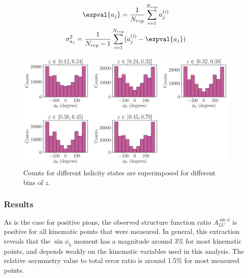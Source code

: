 \begin{gather}
  \expval{a_j} = \frac{1}{N_{rep}} \sum_{i=1}^{N_{rep}} a_{j}^{(i)} \\
  \sigma_{a_j}^{2} = \frac{1}{N_{rep}-1} \sum_{i=1}^{N_{rep}} (a_{j}^{(i)} - \expval{a_j}) 
\end{gather}

\begin{figure}
	\centering
	\includegraphics[width=16cm]{image/plots/kaon-bsa/z-phi-counts.pdf}
	\caption{Counts for different helicity states are superimposed for different bins of $z$.}
\end{figure}

\subsubsection*{Results}
%
%
As is the case for positive pions, the observed structure function ratio $A_{LU}^{\sin\phi}$ is positive for all kinematic points that were measured.  In general, this extraction reveals that the $\sin\phi_h$ moment has a magnitude around 3\% for most kinematic points, and depends weakly on the kinematic variables used in this analysis.  The relative asymmetry value to total error ratio is around 1.5\% for most measured points.


